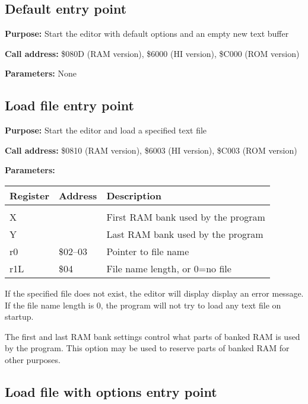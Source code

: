 \documentclass{article}
\begin{document}
    \subsection{Default entry point}

        \textbf{Purpose:} Start the editor with default options and an empty new text buffer

        \textbf{Call address:} \$080D (RAM version), \$6000 (HI version), \$C000 (ROM version)
    
        \textbf{Parameters:} None

    \subsection{Load file entry point}
        
        \textbf{Purpose:} Start the editor and load a specified text file

        \textbf{Call address:} \$0810 (RAM version), \$6003 (HI version), \$C003 (ROM version)

        \textbf{Parameters:} 

        \begin{longtable}[l]{l l l}
            \textbf{Register} & \textbf{Address} & \textbf{Description} \\
	        \hline \\
            X   &          & First RAM bank used by the program \\
            Y   &          & Last RAM bank used by the program \\
            r0  & \$02--03 & Pointer to file name \\
            r1L & \$04     & File name length, or 0=no file \\
        \end{longtable}

        If the specified file does not exist, the editor will display display an
        error message. If the file name length is 0, the program will not try
        to load any text file on startup.

        The first and last RAM bank settings control what parts of banked RAM is
        used by the program. This option may be used to reserve parts of banked RAM
        for other purposes.

    \subsection{Load file with options entry point}
\end{document}
